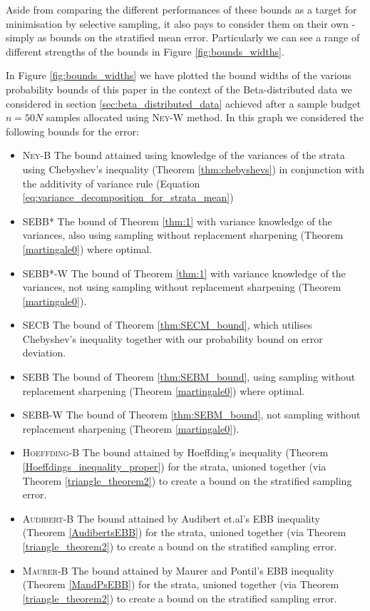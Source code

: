 Aside from comparing the different performances of these bounds as a target for minimisation by selective sampling, it also pays to consider them on their own - simply as bounds on the stratified mean error.
Particularly we can see a range of different strengths of the bounds in Figure \ref{fig:bounds_widths}.

In Figure \ref{fig:bounds_widths} we have plotted the bound widths of the various probability bounds of this paper in the context of the Beta-distributed data we considered in section \ref{sec:beta_distributed_data} achieved after a sample budget $n=50N$ samples allocated using \textsc{Ney-W} method.
In this graph we considered the following bounds for the error:

\begin{itemize}
\item 
\textsc{Ney-B} The bound attained using knowledge of the variances of the strata using Chebyshev's inequality (Theorem \ref{thm:chebyshevs}) in conjunction with the additivity of variance rule (Equation \ref{eq:variance_decomposition_for_strata_mean})
\item 
\textsc{SEBB*} The bound of Theorem \ref{thm:1} with variance knowledge of the variances, also using sampling without replacement sharpening (Theorem \ref{martingale0}) where optimal.
\item 
\textsc{SEBB*-W} The bound of Theorem \ref{thm:1} with variance knowledge of the variances, not using sampling without replacement sharpening (Theorem \ref{martingale0}).
\item 
\textsc{SECB} The bound of Theorem \ref{thm:SECM_bound}, which utilises Chebyshev's inequality together with our probability bound on error deviation.
\item 
\textsc{SEBB} The bound of Theorem \ref{thm:SEBM_bound}, using sampling without replacement sharpening (Theorem \ref{martingale0}) where optimal.
\item 
\textsc{SEBB-W} The bound of Theorem \ref{thm:SEBM_bound}, not sampling without replacement sharpening (Theorem \ref{martingale0}).
\item 
\textsc{Hoeffding-B} The bound attained by Hoeffding's inequality (Theorem \ref{Hoeffdings_inequality_proper}) for the strata, unioned together (via Theorem \ref{triangle_theorem2}) to create a bound on the stratified sampling error.
\item 
\textsc{Audibert-B} The bound attained by Audibert et.al's EBB inequality (Theorem \ref{AudibertsEBB}) for the strata, unioned together (via Theorem \ref{triangle_theorem2}) to create a bound on the stratified sampling error.
\item 
\textsc{Maurer-B} The bound attained by Maurer and Pontil's EBB inequality (Theorem \ref{MandPsEBB}) for the strata, unioned together (via Theorem \ref{triangle_theorem2}) to create a bound on the stratified sampling error.
\end{itemize}

